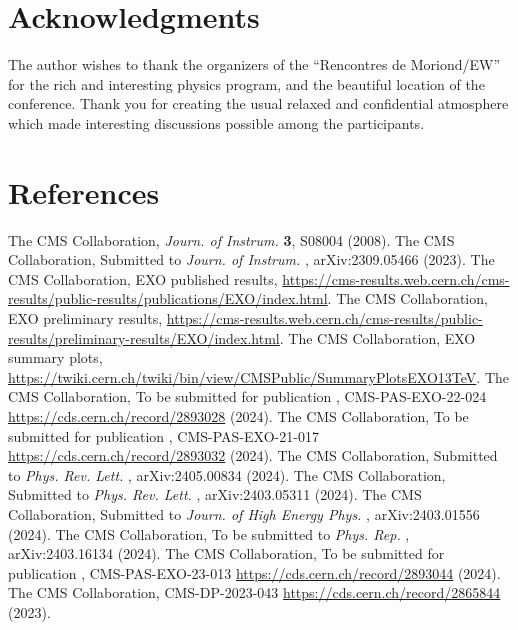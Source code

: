 \documentclass{moriond}
\def\Journal#1#2#3#4{{#1} {\bf #2}, #3 (#4)}
\def\PRL{\em Phys. Rev. Lett.}
\def\JINST{\em Journ. of Instrum.}
\def\JHEP{\em Journ. of High Energy Phys.}
\def\PREP{\em Phys. Rep.}
\begin{document}
\section*{Acknowledgments}

The author wishes to thank the organizers of the “Rencontres de
Moriond/EW” for the rich and interesting physics program, and the
beautiful location of the conference. Thank you for creating the usual
relaxed and confidential atmosphere which made interesting discussions
possible among the participants.

\section*{References}

\begin{thebibliography}{99}

 The CMS Collaboration, \Journal{\JINST}{3}{S08004}{2008}.
 The CMS Collaboration, \Journal{Submitted to \JINST}{}{arXiv:2309.05466}{2023}.
 The CMS Collaboration, EXO published results,
  \url{https://cms-results.web.cern.ch/cms-results/public-results/publications/EXO/index.html}.
 The CMS Collaboration, EXO preliminary results,
  \url{https://cms-results.web.cern.ch/cms-results/public-results/preliminary-results/EXO/index.html}.
 The CMS Collaboration, EXO summary plots,
  \url{https://twiki.cern.ch/twiki/bin/view/CMSPublic/SummaryPlotsEXO13TeV}.
 The CMS Collaboration, \Journal{To be
    submitted for publication}{}{CMS-PAS-EXO-22-024 \url{https://cds.cern.ch/record/2893028}}{2024}.  
 The CMS Collaboration, \Journal{To be
    submitted for publication}{}{CMS-PAS-EXO-21-017 \url{https://cds.cern.ch/record/2893032}}{2024}.  
 The CMS Collaboration, \Journal{Submitted to \PRL}{}{arXiv:2405.00834}{2024}.
 The CMS Collaboration, \Journal{Submitted to
    \PRL}{}{arXiv:2403.05311}{2024}.
 The CMS Collaboration, \Journal{Submitted to
    \JHEP}{}{arXiv:2403.01556}{2024}.
 The CMS Collaboration, \Journal{To be submitted
    to \PREP}{}{arXiv:2403.16134}{2024}. 
 The CMS Collaboration, \Journal{To be
    submitted for publication}{}{CMS-PAS-EXO-23-013 \url{https://cds.cern.ch/record/2893044}}{2024}. 
 The CMS Collaboration, CMS-DP-2023-043
  \url{https://cds.cern.ch/record/2865844} (2023).

\end{thebibliography}
\end{document}
